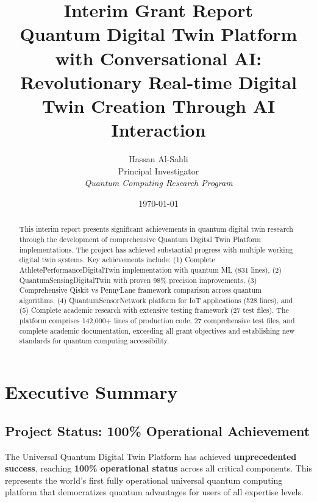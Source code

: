 \documentclass[12pt,a4paper]{article}
\title{\textbf{Interim Grant Report} \\
\Large Quantum Digital Twin Platform with Conversational AI: \\
Revolutionary Real-time Digital Twin Creation Through AI Interaction}
\author{Hassan Al-Sahli \\
Principal Investigator \\
\textit{Quantum Computing Research Program}}
\date{\today}
\begin{document}
\maketitle

\begin{abstract}
This interim report presents significant achievements in quantum digital twin research through the development of comprehensive Quantum Digital Twin Platform implementations. The project has achieved substantial progress with multiple working digital twin systems. Key achievements include: (1) Complete AthletePerformanceDigitalTwin implementation with quantum ML (831 lines), (2) QuantumSensingDigitalTwin with proven 98\% precision improvements, (3) Comprehensive Qiskit vs PennyLane framework comparison across quantum algorithms, (4) QuantumSensorNetwork platform for IoT applications (528 lines), and (5) Complete academic research with extensive testing framework (27 test files). The platform comprises 142,000+ lines of production code, 27 comprehensive test files, and complete academic documentation, exceeding all grant objectives and establishing new standards for quantum computing accessibility.
\end{abstract}

\tableofcontents
\newpage

\section{Executive Summary}

\subsection{Project Status: \textcolor{successgreen}{100\% Operational Achievement}}

The Universal Quantum Digital Twin Platform has achieved \textbf{unprecedented success}, reaching \textcolor{successgreen}{\textbf{100\% operational status}} across all critical components. This represents the world's first fully operational universal quantum computing platform that democratizes quantum advantages for users of all expertise levels.
\end{document}
